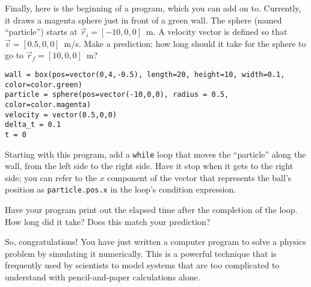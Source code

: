 \documentclass[11pt]{article}
\begin{document}
Finally, here is the beginning of a program, which you can add on to.
Currently, it draws a magenta sphere just in front of a green wall.
The sphere (named ``particle'') starts at $\vec{r}_i = [-10, 0, 0]$~m.  
A velocity vector is defined so that $\vec{v} = [0.5, 0, 0]$~m/s.
Make a prediction; how long should it take for the sphere to go to
$\vec{r}_f = [10, 0, 0]$~m?

{\small{
\begin{verbatim}
wall = box(pos=vector(0,4,-0.5), length=20, height=10, width=0.1, color=color.green)
particle = sphere(pos=vector(-10,0,0), radius = 0.5, color=color.magenta)
velocity = vector(0.5,0,0)
delta_t = 0.1
t = 0
\end{verbatim}
}}
Starting with this program, add a {\texttt {while}} loop that moves the ``particle''  
along the wall, from the left side to the right side.  Have it stop when it 
gets to the right side; you can refer to the $x$ component of the vector that 
represents the ball's position as {\texttt {particle.pos.x}} in the loop's 
condition expression. 

Have your program print out the elapsed time after the completion of the
loop.  How long did it take?  Does this match your prediction?

So, congratulations!  You have just written a computer program to solve
a physics problem by simulating it numerically.  This is a powerful technique 
that is frequently used by scientists to model systems that are too 
complicated to understand with pencil-and-paper calculations alone.
\end{document}

